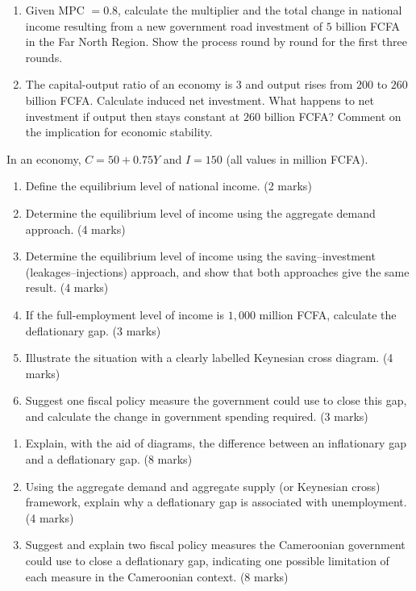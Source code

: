 \documentclass[11pt]{article}
\newcounter{popsec}
\newcounter{popsub}
\newcommand{\courssub}[1]{%
  \stepcounter{popsub}%
  \par\vspace{9pt}\noindent{\popxbold\fontsize{11.5}{13}\selectfont\color{popink}{\color{poporange}\thepopsec.\thepopsub}\hspace{6pt}#1}\par\nopagebreak\vspace{4pt}
}
\begin{document}
\begin{exercice}
\begin{enumerate}
\item Given MPC $= 0.8$, calculate the multiplier and the total change in national income resulting from a new government road investment of $5$ billion FCFA in the Far North Region. Show the process round by round for the first three rounds.
\item The capital-output ratio of an economy is $3$ and output rises from $200$ to $260$ billion FCFA. Calculate induced net investment. What happens to net investment if output then stays constant at $260$ billion FCFA? Comment on the implication for economic stability.
\end{enumerate}
\end{exercice}

\courssub{I prepare for the GCE}

\begin{exercice}
In an economy, $C = 50 + 0.75Y$ and $I = 150$ (all values in million FCFA).
\begin{enumerate}
\item Define the equilibrium level of national income. \hfill (2 marks)
\item Determine the equilibrium level of income using the aggregate demand approach. \hfill (4 marks)
\item Determine the equilibrium level of income using the saving--investment (leakages--injections) approach, and show that both approaches give the same result. \hfill (4 marks)
\item If the full-employment level of income is $1{,}000$ million FCFA, calculate the deflationary gap. \hfill (3 marks)
\item Illustrate the situation with a clearly labelled Keynesian cross diagram. \hfill (4 marks)
\item Suggest one fiscal policy measure the government could use to close this gap, and calculate the change in government spending required. \hfill (3 marks)
\end{enumerate}
\end{exercice}

\begin{exercice}
\begin{enumerate}
\item Explain, with the aid of diagrams, the difference between an inflationary gap and a deflationary gap. \hfill (8 marks)
\item Using the aggregate demand and aggregate supply (or Keynesian cross) framework, explain why a deflationary gap is associated with unemployment. \hfill (4 marks)
\item Suggest and explain two fiscal policy measures the Cameroonian government could use to close a deflationary gap, indicating one possible limitation of each measure in the Cameroonian context. \hfill (8 marks)
\end{enumerate}
\end{exercice}
\end{document}
